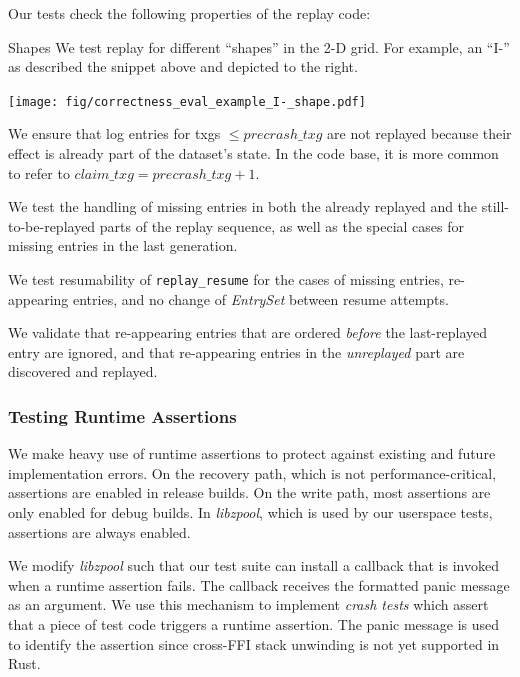 \documentclass[12pt,a4paper,twoside]{book}
\begin{document}
Our tests check the following properties of the replay code:
\begin{description}[noitemsep,leftmargin=1.5cm,labelindent=1cm]
    \begin{minipage}{0.59\textwidth}
    \item[Shapes]
            We test replay for different ``shapes'' in the 2-D grid.
            For example, an ``I-'' as described the snippet above and depicted to the right.
        \end{minipage}
        \begin{minipage}[c]{0.3\textwidth}
            \texttt{[image: fig/correctness\_eval\_example\_I-\_shape.pdf]}
        \end{minipage}
    \item[Claim Txg] We ensure that log entries for txgs $\le precrash\_txg$ are not replayed because their effect is already part of the dataset's state.
        In the code base, it is more common to refer to $claim\_txg = precrash\_txg + 1$.
    \item[Missing Entry Handling] We test the handling of missing entries in both the already replayed and the still-to-be-replayed parts of the replay sequence, as well as the special cases for missing entries in the last generation.
    \item[Resumability] We test resumability of \lstinline{replay_resume} for the cases of missing entries, re-appearing entries, and no change of \textit{EntrySet} between resume attempts.
    \item[Entry Reappearance] We validate that re-appearing entries that are ordered \textit{before} the last-replayed entry are ignored, and that re-appearing entries in the \textit{unreplayed} part are discovered and replayed.
\end{description}

\subsubsection{Testing Runtime Assertions}
We make heavy use of runtime assertions to protect against existing and future implementation errors.
On the recovery path, which is not performance-critical, assertions are enabled in release builds.
On the write path, most assertions are only enabled for debug builds.
In \textit{libzpool}, which is used by our userspace tests, assertions are always enabled.

We modify \textit{libzpool} such that our test suite can install a callback that is invoked when a runtime assertion fails.
The callback receives the formatted panic message as an argument.
We use this mechanism to implement \textit{crash tests} which assert that a piece of test code triggers a runtime assertion.
The panic message is used to identify the assertion since cross-FFI stack unwinding is not yet supported in Rust.
\end{document}
